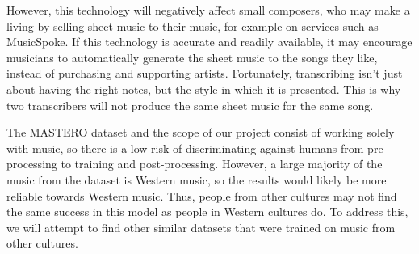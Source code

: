 \documentclass[a4paper,twocolumn,10pt]{article}
\begin{document}
However, this technology will negatively affect small composers, who may make a living by selling sheet music to their music, for example on services such as MusicSpoke\cite{musicspoke}. If this technology is accurate and readily available, it may encourage musicians to automatically generate the sheet music to the songs they like, instead of purchasing and supporting artists. Fortunately, transcribing isn’t just about having the right notes, but the style in which it is presented. This is why two transcribers will not produce the same sheet music for the same song.

The MASTERO dataset and the scope of our project consist of working solely with music, so there is a low risk of discriminating against humans from pre-processing to training and post-processing. However, a large majority of the music from the dataset is Western music, so the results would likely be more reliable towards Western music. Thus, people from other cultures may not find the same success in this model as people in Western cultures do. To address this, we will attempt to find other similar datasets that were trained on music from other cultures.
\printbibliography
\end{document}
